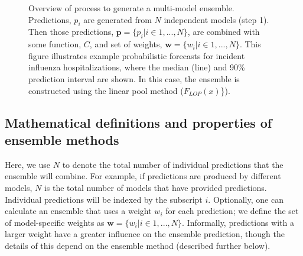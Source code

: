 \documentclass[
]{article}
\begin{document}
\begin{figure}


\caption{\label{fig-ensemble-schematic}Overview of process to generate a
multi-model ensemble. Predictions, \(p_i\) are generated from \(N\)
independent models (step 1). Then those predictions,
\(\pmb{p} = \{p_i|i \in 1, ..., N\}\), are combined with some function,
\(C\), and set of weights, \(\pmb{w} = \{w_i|i \in 1, ..., N\}\). This
figure illustrates example probabilistic forecasts for incident
influenza hospitalizations, where the median (line) and 90\% prediction
interval are shown. In this case, the ensemble is constructed using the
linear pool method (\(F_{LOP}(x)\)\}).}

\end{figure}%

\subsection{Mathematical definitions and properties of ensemble
methods}\label{mathematical-definitions-and-properties-of-ensemble-methods}

Here, we use \(N\) to denote the total number of individual predictions
that the ensemble will combine. For example, if predictions are produced
by different models, \(N\) is the total number of models that have
provided predictions. Individual predictions will be indexed by the
subscript \(i\). Optionally, one can calculate an ensemble that uses a
weight \(w_i\) for each prediction; we define the set of model-specific
weights as \(\pmb{w} = \{w_i | i \in 1, ..., N\}\). Informally,
predictions with a larger weight have a greater influence on the
ensemble prediction, though the details of this depend on the ensemble
method (described further below).
\end{document}
